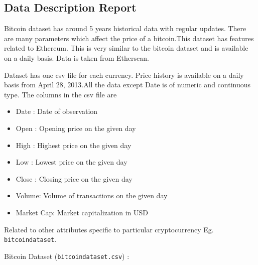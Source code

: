 \documentclass{article}
\begin{document}
\subsection{Data Description Report}
Bitcoin dataset has around 5 years historical data with regular updates. There are many parameters which affect the price of a bitcoin.This dataset has features related to Ethereum. This is very similar to the bitcoin dataset and is available on a daily basis. Data is taken from Etherscan.


Dataset has one csv file for each currency. Price history is available on a daily basis from April 28, 2013.All the data except Date is of numeric and continuous type. The columns in the csv file are
\begin{itemize}
\item Date :  Date of observation
\item Open :  Opening price on the given day
\item High :  Highest price on the given day
\item Low :   Lowest price on the given day
\item Close : Closing price on the given day
\item Volume: Volume of transactions on the given day
\item Market Cap: Market capitalization in USD
\end{itemize}

Related to other attributes specific to particular cryptocurrency Eg.  \texttt{bitcoin\textunderscore dataset}. 

Bitcoin Dataset (\texttt{bitcoin\textunderscore dataset.csv}) :
\end{document}
